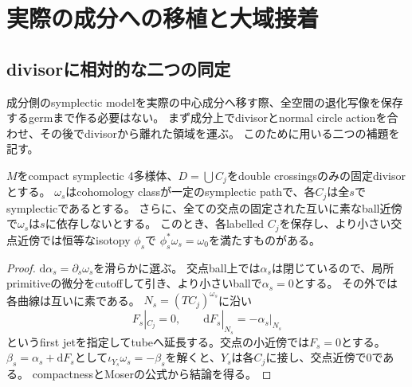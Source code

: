 \section{実際の成分への移植と大域接着}\label{sec:gluing}

\subsection{divisorに相対的な二つの同定}
成分側のsymplectic modelを実際の中心成分へ移す際、全空間の退化写像を保存するgermまで作る必要はない。
まず成分上でdivisorとnormal circle actionを合わせ、その後でdivisorから離れた領域を運ぶ。
このために用いる二つの補題を記す。

\begin{lemma}[交点近傍を固定するMoser同定]\label{glue:pair-moser}
$M$をcompact symplectic 4多様体、$D=\bigcup C_j$をdouble crossingsのみの固定divisorとする。
$\omega_s$はcohomology classが一定のsymplectic pathで、各$C_j$は全$s$でsymplecticであるとする。
さらに、全ての交点の固定された互いに素なball近傍で$\omega_s$は$s$に依存しないとする。
このとき、各labelled $C_j$を保存し、より小さい交点近傍では恒等なisotopy $\phi_s$で
$\phi_s^*\omega_s=\omega_0$を満たすものがある。
\end{lemma}
\begin{proof}
$\mathrm d\alpha_s=\partial_s\omega_s$を滑らかに選ぶ。
交点ball上では$\alpha_s$は閉じているので、局所primitiveの微分をcutoffして引き、より小さいballで$\alpha_s=0$とする。
その外では各曲線は互いに素である。
$N_s=(TC_j)^{\omega_s}$に沿い
\[
F_s|_{C_j}=0,\qquad \mathrm dF_s|_{N_s}=-\alpha_s|_{N_s}
\]
というfirst jetを指定してtubeへ延長する。交点の小近傍では$F_s=0$とする。
$\beta_s=\alpha_s+\mathrm dF_s$として$\iota_{Y_s}\omega_s=-\beta_s$を解くと、$Y_s$は各$C_j$に接し、交点近傍で0である。
compactnessとMoserの公式から結論を得る。
\end{proof}

